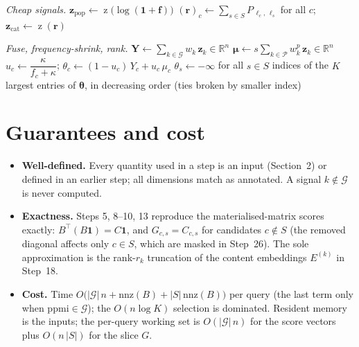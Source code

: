\documentclass[11pt]{article}
\newcommand{\R}{\mathbb{R}}
\newcommand{\indic}{\mathbf{1}}
\newcommand{\z}{\operatorname{z}}
\newcommand{\seeds}{S}
\begin{document}
\begin{algorithm}[h]
\begin{algorithmic}[1]
\Statex \emph{Cheap signals.}
\quad $\bm{z}_{\mathrm{pop}} \gets \z\!\big(\log(\bm{1}+\bm{f})\big)$ \EndIf
{}
  \State $(\bm{r})_c \gets \sum_{s\in\seeds} P_{\,\ell_c,\,\ell_s}$ for all $c$;\quad $\bm{z}_{\mathrm{cat}} \gets \z(\bm{r})$
\EndIf

\Statex \emph{Fuse, frequency-shrink, rank.}
\State $\bm{Y} \gets \sum_{k\in\mathcal{G}} w_k\,\bm{z}_k \in \R^{n}$
\State $\bm{\mu} \gets s \sum_{k\in\mathcal{P}} w^{p}_k\,\bm{z}_k \in \R^{n}$ 
  \State $u_c \gets \dfrac{\kappa}{f_c + \kappa}$;\qquad
         $\theta_c \gets (1-u_c)\,Y_c + u_c\,\mu_c$
\EndFor
\State $\theta_s \gets -\infty$ for all $s\in\seeds$ 
\State \Return indices of the $K$ largest entries of $\bm{\theta}$, in decreasing order
       (ties broken by smaller index)
\end{algorithmic}
\end{algorithm}

\section{Guarantees and cost}
\begin{itemize}\itemsep1pt
  \item \textbf{Well-defined.} Every quantity used in a step is an input (Section~2) or defined in an
        earlier step; all dimensions match as annotated. A signal $k\notin\mathcal{G}$ is never computed.
  \item \textbf{Exactness.} Steps 5, 8--10, 13 reproduce the materialised-matrix scores exactly:
        $B^\top(B\indic)=C\indic$, and $G_{c,s}=C_{c,s}$ for candidates $c\notin\seeds$ (the removed
        diagonal affects only $c\in\seeds$, which are masked in Step~26). The sole approximation is the
        rank-$r_k$ truncation of the content embeddings $E^{(k)}$ in Step~18.
  \item \textbf{Cost.} Time $O\!\big(|\mathcal{G}|\,n + \mathrm{nnz}(B) + |\seeds|\,\mathrm{nnz}(B)\big)$ per
        query (the last term only when $\mathrm{ppmi}\in\mathcal{G}$); the $O(n\log K)$ selection is
        dominated. Resident memory is the inputs; the per-query working set is $O(|\mathcal{G}|\,n)$ for the
        score vectors plus $O(n\,|\seeds|)$ for the slice $G$.
\end{itemize}
\end{document}

